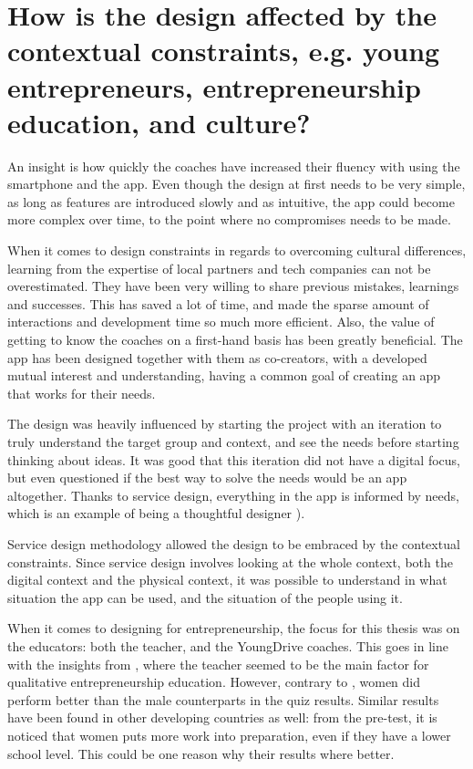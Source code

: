 
\section{How is the design affected by the contextual constraints, e.g. young entrepreneurs, entrepreneurship education, and culture?} %

  An insight is how quickly the coaches have increased their fluency with using the smartphone and the app. Even though the design at first needs to be very simple, as long as features are introduced slowly and as intuitive, the app could become more complex over time, to the point where no compromises needs to be made.

  When it comes to design constraints in regards to overcoming cultural differences, learning from the expertise of local partners and tech companies can not be overestimated. They have been very willing to share previous mistakes, learnings and successes. This has saved a lot of time, and made the sparse amount of interactions and development time so much more efficient. Also, the value of getting to know the coaches on a first-hand basis has been greatly beneficial. The app has been designed together with them as co-creators, with a developed mutual interest and understanding, having a common goal of creating an app that works for their needs.

  The design was heavily influenced by starting the project with an iteration to truly understand the target group and context, and see the needs before starting thinking about ideas. It was good that this iteration did not have a digital focus, but even questioned if the best way to solve the needs would be an app altogether. Thanks to service design, everything in the app is informed by needs, which is an example of being a thoughtful designer \citep{lowgren} \citep{stickdorn}).

  Service design methodology allowed the design to be embraced by the contextual constraints. Since service design involves looking at the whole context, both the digital context and the physical context, it was possible to understand in what situation the app can be used, and the situation of the people using it.

  When it comes to designing for entrepreneurship, the focus for this thesis was on the educators: both the teacher, and the YoungDrive coaches. This goes in line with the insights from \cite{ruskovaara}, where the teacher seemed to be the main factor for qualitative entrepreneurship education. However, contrary to \cite{ruskovaara}, women did perform better than the male counterparts in the quiz results. Similar results have been found in other developing countries as well: from the pre-test, it is noticed that women puts more work into preparation, even if they have a lower school level. This could be one reason why their results where better.

